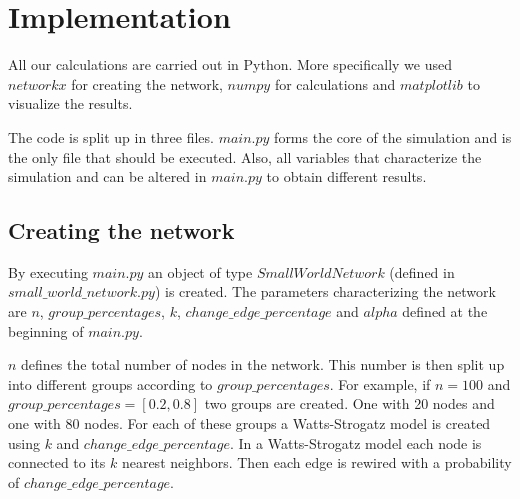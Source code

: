 \documentclass[11pt]{article}
\begin{document}


\section{Implementation}

All our calculations are carried out in Python. More specifically we used $networkx$ for creating the network, $numpy$ for calculations and $matplotlib$ to visualize the results.

The code is split up in three files. $main.py$ forms the core of the simulation and is the only file that should be executed. Also, all variables that characterize the simulation and can be altered in $main.py$ to obtain different results.

\subsection{Creating the network}
By executing $main.py$ an object of type $SmallWorldNetwork$ (defined in\\ $small\_world\_network.py$) is created. The parameters characterizing the network are $n$, $group\_percentages$, $k$, $change\_edge\_percentage$ and $alpha$ defined at the beginning of $main.py$.

$n$ defines the total number of nodes in the network. This number is then split up into different groups according to $group\_percentages$. For example, if $n=100$ and $group\_percentages = [0.2, 0.8]$ two groups are created. One with 20 nodes and one with 80 nodes. For each of these groups a Watts-Strogatz model is created using $k$ and $change\_edge\_percentage$. In a Watts-Strogatz model each node is connected to its $k$ nearest neighbors. Then each edge is rewired with a probability of  $change\_edge\_percentage$.
\end{document}
